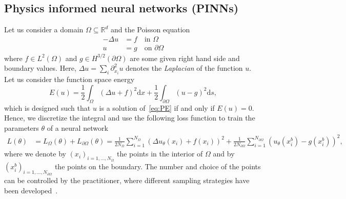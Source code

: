\subsection{Physics informed neural networks (PINNs)}
Let us consider a domain $\Omega\subseteq\mathbb R^d$ and the Poisson equation %
\begin{align*}\tag{PE}\label{eq:PE}
  -\Delta u & = f \quad \text{in }\Omega \\
  u & = g \quad \text{on }\partial\Omega
\end{align*}
where $f\in L^2(\Omega)$ and $g\in H^{3/2}(\partial\Omega)$ are some given right hand side and boundary values.
Here, $\Delta u = \sum_i \partial_{x_i}^2 u$ denotes the \emph{Laplacian} of the function $u$. 
Let us consider the function space energy 
  \[ E(u) = \frac{1}{2} \int_\Omega (\Delta u + f)^2 \mathrm dx + \frac12 \int_{\partial\Omega} (u-g)^2 \mathrm ds, \]
which is designed such that $u$ is a solution of~\eqref{eq:PE} if and only if $E(u)=0$. 
Hence, we discretize the integral and use the following loss function to train the parameters $\theta$ of a neural network
\begin{align}
  L(\theta)
  &=
    L_\Omega(\theta) + %
    L_{\partial\Omega}(\theta)
  =
    \frac{1}{2N_\Omega} \sum_{i=1}^{N_\Omega} (\Delta u_\theta(x_i) + f(x_i))^2 + \frac{1}{2N_{\partial\Omega}}\sum_{i=1}^{N_{\partial\Omega}} ( u_\theta(x^b_i) - g(x^b_i))^2,
\end{align}
where we denote by $(x_i)_{i=1,\dots,N_\Omega}$ the points in the interior of $\Omega$ and by $(x^b_i)_{i=1,\dots,N_{\partial\Omega}}$ the points on the boundary.
The number and choice of the points can be controlled by the practitioner, where different sampling strategies have been developed~\cite[text]{keylist}.

